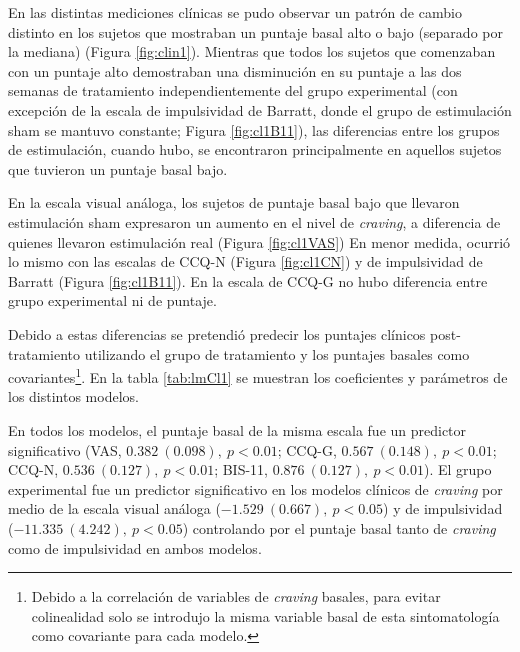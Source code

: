 En las distintas mediciones clínicas se pudo observar un patrón de cambio distinto en los sujetos que mostraban un puntaje basal alto o bajo (separado por la mediana) (Figura \ref{fig:clin1}). Mientras que todos los sujetos que comenzaban con un puntaje alto demostraban una disminución en su puntaje a las dos semanas de tratamiento independientemente del grupo experimental (con excepción de la escala de impulsividad de Barratt, donde el grupo de estimulación sham se mantuvo constante; Figura \ref{fig:cl1B11}), las diferencias entre los grupos de estimulación, cuando hubo, se encontraron principalmente en aquellos sujetos que tuvieron un puntaje basal bajo. \par
En la escala visual análoga, los sujetos de puntaje basal bajo que llevaron estimulación sham expresaron un aumento en el nivel de \textit{craving}, a diferencia de quienes llevaron estimulación real (Figura \ref{fig:cl1VAS}) En menor medida, ocurrió lo mismo con las escalas de CCQ-N (Figura \ref{fig:cl1CN}) y de impulsividad de Barratt (Figura \ref{fig:cl1B11}). En la escala de CCQ-G no hubo diferencia entre grupo experimental ni de puntaje. \par

Debido a estas diferencias se pretendió predecir los puntajes clínicos post-tratamiento utilizando el grupo de tratamiento y los puntajes basales como covariantes\footnote{Debido a la correlación de variables de \textit{craving} basales, para evitar colinealidad solo se introdujo la misma variable basal de esta sintomatología como covariante para cada modelo.}. En la tabla \ref{tab:lmCl1} se muestran los coeficientes y parámetros de los distintos modelos. \par
En todos los modelos, el puntaje basal de la misma escala fue un predictor significativo (VAS, $0.382\ (0.098),\ p<0.01$; CCQ-G, $0.567\ (0.148),\ p<0.01$; CCQ-N, $0.536\ (0.127),\ p<0.01$; BIS-11, $0.876\ (0.127),\ p<0.01$). El grupo experimental fue un predictor significativo en los modelos clínicos de \textit{craving} por medio de la escala visual análoga ($-1.529\ (0.667),\ p<0.05$) y de impulsividad ($-11.335\ (4.242),\ p<0.05$) controlando por el puntaje basal tanto de \textit{craving} como de impulsividad en ambos modelos.

